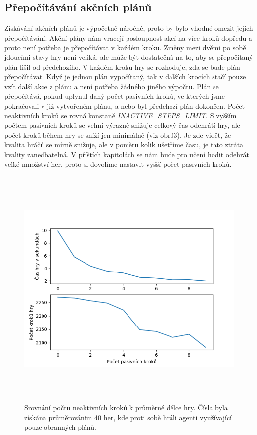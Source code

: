\subsection{Přepočítávání akčních plánů}
Získávání akčních plánů je výpočetně náročné, proto by bylo vhodné omezit jejich přepočítávání. Akční plány nám vracejí posloupnost akcí na více kroků dopředu a proto není potřeba je přepočítávat v každém kroku.
Změny mezi dvěmi po sobě jdoucími stavy hry není veliká, ale může být dostatečná na to, aby se přepočítaný plán lišil od předchozího.
V každém kroku hry se rozhoduje, zda se bude plán přepočítávat. Když je jednou plán vypočítaný, tak v dalších krocích stačí pouze vzít další akce z plánu a není potřeba žádného jiného výpočtu.
Plán se přepočítává, pokud uplynul daný počet pasivních kroků, ve kterých jsme pokračovali v již vytvořeném plánu, a nebo byl předchozí plán dokončen.
Počet neaktivních kroků se rovná konstaně \emph{\uppercase{inactive\_steps\_limit}}. 
S vyšším počtem pasivních kroků se velmi výrazně snižuje celkový čas odehrátí hry, ale počet kroků během hry se sníží jen minimálně (viz obr03).
Je zde vidět, že kvalita hráčů se mírně snižuje, ale v poměru kolik ušetříme času, je tato ztráta kvality zanedbatelná.
V příštích kapitolách se nám bude pro učení hodit odehrát velké množství her, proto si dovolíme nastavit vyšší počet pasivních kroků.


\begin{figure}[hp]

\includegraphics[width=145mm, height=120mm]{./Obrazky/Inactive_steps_comparison2.png}
\caption{Srovnání počtu neaktivních kroků k průměrné délce hry. Čísla byla získána průměrováním 40 her, kde proti sobě hráli agenti využívající pouze obranných plánů.}
\label{obr03:}
\end{figure}

